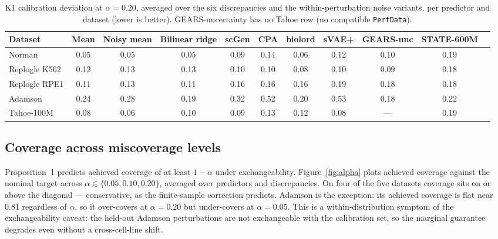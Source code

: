 \documentclass{article}
\begin{document}
\begin{table}[t]
\caption{K1 calibration deviation at $\alpha = 0.20$, averaged over the six discrepancies and the within-perturbation noise variants, per predictor and dataset (lower is better). GEARS-uncertainty has no Tahoe row (no compatible \texttt{PertData}).}
\label{tab:k1multi}
\vskip 0.1in
\begin{center}
\begin{small}
\setlength{\tabcolsep}{4pt}
\begin{tabular}{lcccccccccc}
\toprule
Dataset & Mean & Noisy mean & Bilinear ridge & scGen & CPA & biolord & sVAE+ & GEARS-unc & STATE-600M \\
\midrule
Norman        & 0.05 & 0.05 & 0.05 & 0.09 & 0.14 & 0.06 & 0.12 & 0.10 & 0.19 \\
Replogle K562 & 0.12 & 0.13 & 0.13 & 0.10 & 0.10 & 0.08 & 0.10 & 0.09 & 0.18 \\
Replogle RPE1 & 0.11 & 0.13 & 0.11 & 0.16 & 0.16 & 0.16 & 0.19 & 0.18 & 0.18 \\
Adamson       & 0.24 & 0.28 & 0.19 & 0.32 & 0.52 & 0.20 & 0.53 & 0.18 & 0.22 \\
Tahoe-100M    & 0.08 & 0.06 & 0.10 & 0.09 & 0.13 & 0.12 & 0.08 & --- & 0.19 \\
\bottomrule
\end{tabular}
\end{small}
\end{center}
\vskip -0.1in
\end{table}

\subsection{Coverage across miscoverage levels}
Proposition~1 predicts achieved coverage of at least $1 - \alpha$ under exchangeability. Figure~\ref{fig:alpha} plots achieved coverage against the nominal target across $\alpha \in \{0.05, 0.10, 0.20\}$, averaged over predictors and discrepancies. On four of the five datasets coverage sits on or above the diagonal --- conservative, as the finite-sample correction predicts. Adamson is the exception: its achieved coverage is flat near $0.81$ regardless of $\alpha$, so it over-covers at $\alpha = 0.20$ but under-covers at $\alpha = 0.05$. This is a within-distribution symptom of the exchangeability caveat: the held-out Adamson perturbations are not exchangeable with the calibration set, so the marginal guarantee degrades even without a cross-cell-line shift.
\end{document}
